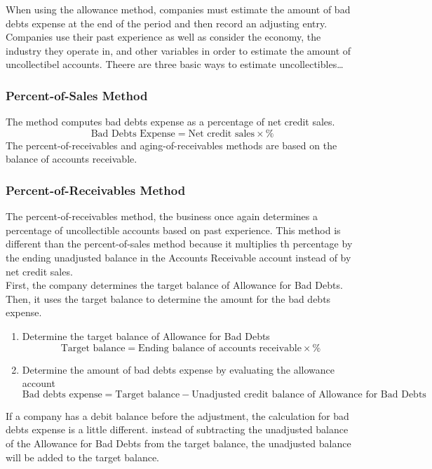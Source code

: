 \documentclass{article}
\begin{document}
When using the allowance method, companies must estimate the amount of bad debts expense at the end of the period and then record an adjusting entry. Companies use their past experience as well as consider the economy, the industry they operate in, and other variables in order to estimate the amount of uncollectibel accounts. Theere are three basic ways to estimate uncollectibles\dots 

\subsubsection{Percent-of-Sales Method}

The  method computes bad debts expense as a percentage of net credit sales. $$\textrm{Bad Debts Expense} = \textrm{Net credit sales} \times \textrm{\%}$$ The percent-of-receivables and aging-of-receivables methods are based on the balance of accounts receivable. 

\subsubsection{Percent-of-Receivables Method}

The percent-of-receivables method, the business once again determines a percentage of uncollectible accounts based on past experience. This method is different than the percent-of-sales method because it multiplies th percentage by the ending unadjusted balance in the Accounts Receivable account instead of by net credit sales. \\ 

First, the company determines the target balance of Allowance for Bad Debts. Then, it uses the target balance to determine the amount for the bad debts expense. 
\begin{enumerate}
  \item Determine the target balance of Allowance for Bad Debts $$\textrm{Target balance} = \textrm{Ending balance of accounts receivable} \times \%$$ 
  \item Determine the amount of bad debts expense by evaluating the allowance account $$\textrm{Bad debts expense} = \textrm{Target balance} - \textrm{Unadjusted credit balance of Allowance for Bad Debts}$$
\end{enumerate}

If a company has a debit balance before the adjustment, the calculation for bad debts expense is a little different. instead of subtracting the unadjusted balance of the Allowance for Bad Debts from the target balance, the unadjusted balance will be added to the target balance. 
\end{document}
